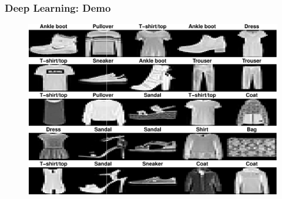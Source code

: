 \documentclass[
  shownotes,
  xcolor={svgnames},
  hyperref={colorlinks,citecolor=DarkBlue,linkcolor=DarkRed,urlcolor=DarkBlue}
  , aspectratio=169]{beamer}
\begin{document}
\begin{frame}[fragile]
\frametitle{Deep Learning: Demo}

  \begin{figure}[H] \centering
            \captionsetup{justification=centering}
              \includegraphics[scale=0.4]{figures/unnamed-chunk-5-1.pdf}
              
 \end{figure}

 \end{frame}
\end{document}
